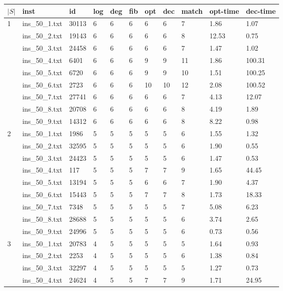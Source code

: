 \begin{table}[]
\begin{tabular}{lllllllllll}
 $|S|$ & inst & id & log & deg & fib & opt & dec & match & opt-time & dec-time \\\hline
\multirow{9}{*}{1}
& ins\_50\_1.txt & 30113 & 6 & 6 & 6 & 6  & 6   & 7  &1.86	&1.07	\\
& ins\_50\_2.txt & 19143 & 6 & 6 & 6 & 6  & 6   & 8  &12.53	&0.75	\\
& ins\_50\_3.txt & 24458 & 6 & 6 & 6 & 6  & 6   & 7  &1.47	&1.02	\\
& ins\_50\_4.txt & 6401  & 6 & 6 & 6 & 9  & 9   & 11 & 1.86	&100.31	 \\
& ins\_50\_5.txt & 6720  & 6 & 6 & 6 & 9  & 9   & 10 & 1.51	&100.25	 \\
& ins\_50\_6.txt & 2723  & 6 & 6 & 6 & 10 & 10  & 12 & 2.08	&100.52	 \\
& ins\_50\_7.txt & 27741 & 6 & 6 & 6 & 6  & 6   & 7  &4.13	&12.07	\\
& ins\_50\_8.txt & 20708 & 6 & 6 & 6 & 6  & 6   & 8  &4.19	&1.89	\\
& ins\_50\_9.txt & 14312 & 6 & 6 & 6 & 6  & 6   & 8  &8.22	&0.98	\\
\hline 
\multirow{9}{*}{2}
& ins\_50\_1.txt & 1986  & 5 & 5 & 5 & 5  & 5   & 6 &1.55	&1.32	\\
& ins\_50\_2.txt & 32595 & 5 & 5 & 5 & 5  & 5   & 6 &1.90	&0.55	\\
& ins\_50\_3.txt & 24423 & 5 & 5 & 5 & 5  & 5   & 6 &1.47	&0.53	\\
& ins\_50\_4.txt & 117   & 5 & 5 & 5 & 7  & 7   & 9 &1.65	&44.45	\\
& ins\_50\_5.txt & 13194 & 5 & 5 & 5 & 6  & 6   & 7 &1.90	&4.37	\\
& ins\_50\_6.txt & 15443 & 5 & 5 & 5 & 7  & 7   & 8 &1.73	&18.33	\\
& ins\_50\_7.txt & 7348  & 5 & 5 & 5 & 5  & 5   & 7 &5.08	&6.23	\\
& ins\_50\_8.txt & 28688 & 5 & 5 & 5 & 5  & 5   & 6 &3.74	&2.65	\\
& ins\_50\_9.txt & 24996 & 5 & 5 & 5 & 5  & 5   & 6 &0.73	&0.56	\\
\hline 
\multirow{9}{*}{3}
& ins\_50\_1.txt & 20783 & 4 & 5 & 5 & 5  & 5   & 5 &1.64	&0.93	\\
& ins\_50\_2.txt & 2253  & 4 & 5 & 5 & 5  & 5   & 6 &1.38	&0.84	\\
& ins\_50\_3.txt & 32297 & 4 & 5 & 5 & 5  & 5   & 5 &1.27	&0.73	\\
& ins\_50\_4.txt & 24624 & 4 & 5 & 5 & 7  & 7   & 9 &1.71	&24.95	\\

\end{tabular}
\end{table}

